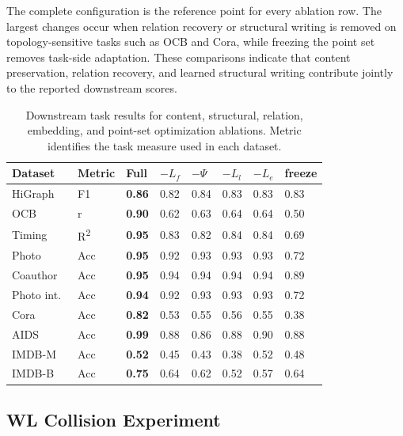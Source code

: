 The complete configuration is the reference point for every ablation row.  The
largest changes occur when relation recovery or structural writing is removed
on topology-sensitive tasks such as OCB and Cora, while freezing the point set
removes task-side adaptation.  These comparisons indicate that content
preservation, relation recovery, and learned structural writing contribute
jointly to the reported downstream scores.

\begin{table}[t]
  \centering
  \caption{Downstream task results for content, structural, relation, embedding, and point-set optimization ablations. Metric identifies the task measure used in each dataset.}
  \label{tab:ablation-results}
  \setlength{\tabcolsep}{2pt} %
  \begin{tabularx}{\columnwidth}{@{} ll *{6}{Y} @{}}
    \toprule
    Dataset & Metric & Full & \(-L_f\) & \(-\Psi\) & \(-L_l\) & \(-L_e\) & freeze \\
    \midrule
    HiGraph~\cite{chen2025higraph} & F1 & \textbf{0.86} & 0.82 & 0.84 & 0.83 & 0.83 & 0.83 \\
    OCB~\cite{dong2023cktgnn} & r & \textbf{0.90} & 0.62 & 0.63 & 0.64 & 0.64 & 0.50 \\
    Timing~\cite{guo2022timing} & R\textsuperscript{2} & \textbf{0.95} & 0.83 & 0.82 & 0.84 & 0.84 & 0.69 \\
    Photo~\cite{shchur2018} & Acc & \textbf{0.95} & 0.92 & 0.93 & 0.93 & 0.93 & 0.72 \\
    Coauthor~\cite{shchur2018} & Acc & \textbf{0.95} & 0.94 & 0.94 & 0.94 & 0.94 & 0.89 \\
    Photo int.~\cite{shchur2018} & Acc & \textbf{0.94} & 0.92 & 0.93 & 0.93 & 0.93 & 0.72 \\
    Cora~\cite{sen2008,yang2016} & Acc & \textbf{0.82} & 0.53 & 0.55 & 0.56 & 0.55 & 0.38 \\
    AIDS~\cite{morris2020} & Acc & \textbf{0.99} & 0.88 & 0.86 & 0.88 & 0.90 & 0.88 \\
    IMDB-M~\cite{yang2015} & Acc & \textbf{0.52} & 0.45 & 0.43 & 0.38 & 0.52 & 0.48 \\
    IMDB-B~\cite{yang2015} & Acc & \textbf{0.75} & 0.64 & 0.62 & 0.52 & 0.57 & 0.64 \\
    \bottomrule
  \end{tabularx}
\end{table}

\subsection{WL Collision Experiment}
\label{sec:wl-diagnostic}

